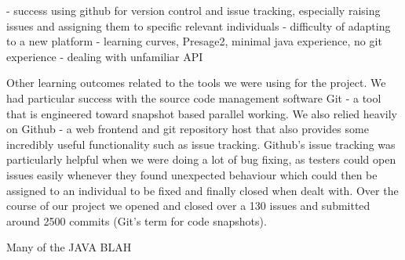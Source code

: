 - success using github for version control and issue tracking, especially raising issues and assigning them to specific relevant individuals
- difficulty of adapting to a new platform - learning curves, Presage2, minimal java experience, no git experience
- dealing with unfamiliar API

Other learning outcomes related to the tools we were using for the project. We had particular success with the source code management software Git - a tool that is engineered toward snapshot based parallel working. We also relied heavily on Github - a web frontend and git repository host that also provides some incredibly useful functionality such as issue tracking. Github's issue tracking was particularly helpful when we were doing a lot of bug fixing, as testers could open issues easily whenever they found unexpected behaviour which could then be assigned to an individual to be fixed and finally closed when dealt with. Over the course of our project we opened and closed over a 130 issues and submitted around 2500 commits (Git's term for code snapshots).

Many of the JAVA BLAH
